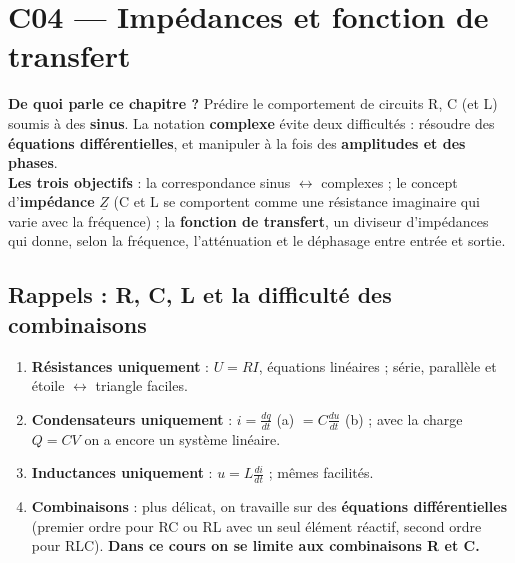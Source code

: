 \chapter{C04 --- Impédances et fonction de transfert}

\begin{rembox}[title=En bref]
\textbf{De quoi parle ce chapitre ?} Prédire le comportement de circuits R, C (et L) soumis à
des \textbf{sinus}. La notation \textbf{complexe} évite deux difficultés : résoudre des
\textbf{équations différentielles}, et manipuler à la fois des \textbf{amplitudes et des
phases}. \\
\textbf{Les trois objectifs} : la correspondance sinus $\leftrightarrow$ complexes ; le
concept d'\textbf{impédance} $\underline Z$ (C et L se comportent comme une \og résistance
imaginaire\fg{} qui varie avec la fréquence) ; la \textbf{fonction de transfert}, un diviseur
d'impédances qui donne, selon la fréquence, l'atténuation et le déphasage entre entrée et
sortie.
\end{rembox}

\section{Rappels : R, C, L et la difficulté des combinaisons}


\begin{propbox}[title=Le degré de complexité]
\begin{enumerate}
  \item \textbf{Résistances uniquement} : $U = RI$, équations linéaires ; série, parallèle et
        étoile $\leftrightarrow$ triangle faciles.
  \item \textbf{Condensateurs uniquement} : $i = \frac{dq}{dt}$ (a) $= C\frac{du}{dt}$ (b) ;
        avec la charge $Q = CV$ on a encore un système linéaire.
  \item \textbf{Inductances uniquement} : $u = L\frac{di}{dt}$ ; mêmes facilités.
  \item \textbf{Combinaisons} : plus délicat, on travaille sur des \textbf{équations
        différentielles} (premier ordre pour RC ou RL avec un seul élément réactif, second
        ordre pour RLC). \textbf{Dans ce cours on se limite aux combinaisons R et C.}
\end{enumerate}
\end{propbox}

